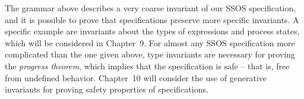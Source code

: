 The grammar above describes a very coarse invariant of our SSOS
specification, and it is possible to prove that specifications
preserve more specific invariants. A specific example are invariants
about the types of expressions and process states, which will be
considered in Chapter~9. For almost any SSOS specification more
complicated than the one given above, type invariants are necessary
for proving the {\it progress theorem}, which implies that the
specification is safe -- that is, free from undefined behavior.
Chapter~10 will consider the use of generative invariants for proving
safety properties of specifications.
